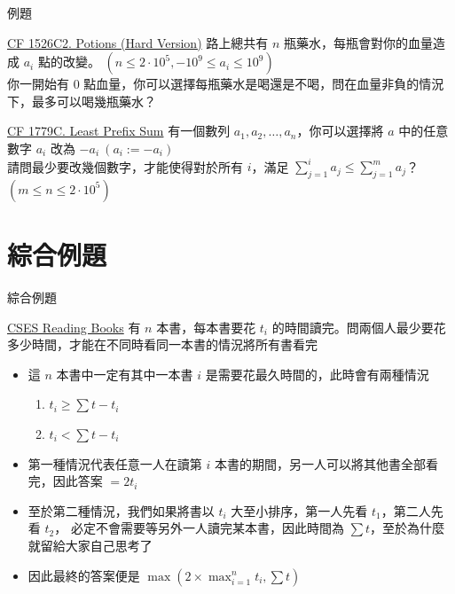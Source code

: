 \documentclass[aspectratio=169]{beamer}
\begin{document}
    \begin{frame}{例題}
        \begin{block}{\href{https://codeforces.com/problemset/problem/1526/C2}{CF 1526C2. Potions (Hard Version)}}
            路上總共有 $n$ 瓶藥水，每瓶會對你的血量造成 $a_i$ 點的改變。 $(n \le 2 \cdot 10^5, -10^9 \le a_i \le 10^9)$\\
            你一開始有 $0$ 點血量，你可以選擇每瓶藥水是喝還是不喝，問在血量非負的情況下，最多可以喝幾瓶藥水？
        \end{block}

        \begin{block}{\href{https://codeforces.com/problemset/problem/1779/C}{CF 1779C. Least Prefix Sum}}
            有一個數列 $a_1, a_2, \dots, a_n$，你可以選擇將 $a$ 中的任意數字 $a_i$ 改為 $-a_i\ (a_i := -a_i)$\\
            請問最少要改幾個數字，才能使得對於所有 $i$，滿足 $\sum_{j = 1}^{i}{a_j} \le \sum_{j = 1}^{m}{a_j}$？$(m \le n \le 2 \cdot 10^5)$
        \end{block}
    \end{frame}

    \section{綜合例題}

    \begin{frame}{綜合例題}
        \begin{block}{\href{https://cses.fi/problemset/task/1631/}{CSES Reading Books}}
            有 $n$ 本書，每本書要花 $t_i$ 的時間讀完。問兩個人最少要花多少時間，才能在不同時看同一本書的情況將所有書看完
        \end{block}

        \begin{itemize}
            \item<1-> 這 $n$ 本書中一定有其中一本書 $i$ 是需要花最久時間的，此時會有兩種情況
            \begin{enumerate}
                \item<2-> $t_i \ge \sum{t} - t_i$ 
                \item<2-> $t_i < \sum{t} - t_i$
            \end{enumerate}
            \item<3-> 第一種情況代表任意一人在讀第 $i$ 本書的期間，另一人可以將其他書全部看完，因此答案 $= 2t_i$
            \item<4-> 至於第二種情況，我們如果將書以 $t_i$ 大至小排序，第一人先看 $t_1$，第二人先看 $t_2$，
            必定不會需要等另外一人讀完某本書，因此時間為 $\sum{t}$，至於為什麼就留給大家自己思考了
            \item<5-> 因此最終的答案便是 $\max(2 \times \displaystyle\max_{i = 1}^{n}t_i, \sum{t})$
        \end{itemize}
    \end{frame}
\end{document}
